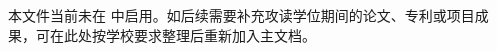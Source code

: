 
\begin{achievements}

\begin{theachievements}[说明]
  \item 本文件当前未在  中启用。如后续需要补充攻读学位期间的论文、专利或项目成果，可在此处按学校要求整理后重新加入主文档。
\end{theachievements}

\end{achievements}
